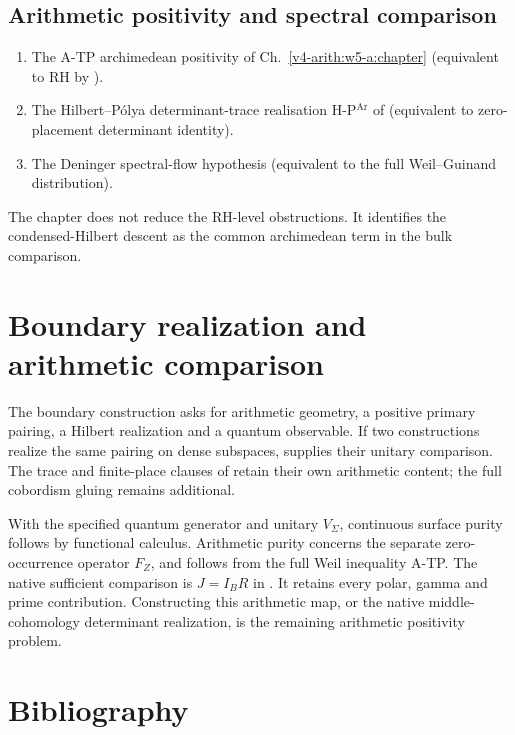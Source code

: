 \subsection*{Arithmetic positivity and spectral comparison}

\begin{enumerate}
\item The A-TP archimedean positivity of
Ch.~\ref{v4-arith:w5-a:chapter} (equivalent to RH by
).
\item The Hilbert--P\'olya determinant-trace realisation H-P\(^{\mathrm{Ar}}\)
of  (equivalent to zero-placement
determinant identity).
\item The Deninger spectral-flow hypothesis
 (equivalent to the full
Weil--Guinand distribution).
\end{enumerate}

The chapter does not reduce the RH-level obstructions. It identifies
the condensed-Hilbert descent as the common archimedean term in the
bulk comparison.

\section{Boundary realization and arithmetic comparison}
\label{v4-arith:w10-a:summary}

The boundary construction asks for arithmetic geometry, a positive
primary pairing, a Hilbert realization and a quantum observable.
If two constructions realize the same pairing on dense subspaces,
 supplies their unitary
comparison. The trace and finite-place clauses of
 retain their own
arithmetic content; the full cobordism gluing remains additional.

With the specified quantum generator and unitary \(V_\Sigma\),
continuous surface purity follows by functional calculus.
Arithmetic purity concerns the separate zero-occurrence operator
\(F_Z\), and follows from the full Weil inequality A-TP.
The native sufficient comparison is \(J=I_BR\) in
. It retains every polar,
gamma and prime contribution. Constructing this arithmetic map,
or the native middle-cohomology determinant realization, is the
remaining arithmetic positivity problem.
\section{Bibliography}
\label{v4-arith:w10-a:bibliography}

